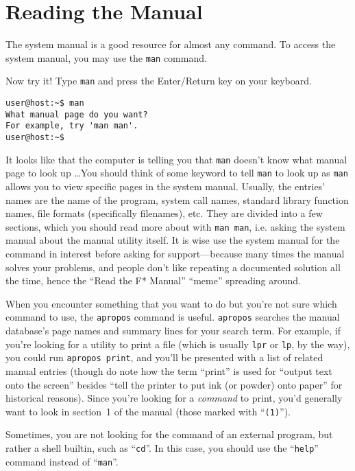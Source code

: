 \documentclass{book}
\begin{document}
\section{Reading the Manual}

The system manual is a good resource for almost any command. To access the system manual, you may use the \verb|man| command.

Now try it!  Type \verb|man| and press the Enter/Return key on your keyboard.
\begin{verbatim}
user@host:~$ man
What manual page do you want?
For example, try 'man man'.
user@host:~$
\end{verbatim}

It looks like that the computer is telling you that \verb|man| doesn't know what manual page to look up \ldots You should think of some keyword to tell \verb|man| to look up as \verb|man| allows you to view specific pages in the system manual. Usually, the entries' names are the name of the program, system call names, standard library function names, file formats (specifically filenames), etc. They are divided into a few sections, which you should read more about with \verb|man man|, i.e. asking the system manual about the manual utility itself. It is wise use the system manual for the command in interest before asking for support---because many times the manual solves your problems, and people don't like repeating a documented solution all the time, hence the ``Read the F* Manual'' ``meme'' spreading around.

When you encounter something that you want to do but you're not sure which command to use, the \verb|apropos| command is useful. \verb|apropos| searches the manual database's page names and summary lines for your search term. For example, if you're looking for a utility to print a file (which is usually \verb|lpr| or \verb|lp|, by the way), you could run \verb|apropos print|, and you'll be presented with a list of related manual entries (though do note how the term ``print'' is used for ``output text onto the screen'' besides ``tell the printer to put ink (or powder) onto paper'' for historical reasons). Since you're looking for a \emph{command} to print, you'd generally want to look in section~1 of the manual (those marked with ``\verb|(1)|'').

Sometimes, you are not looking for the command of an external program, but rather a shell builtin, such as ``\verb|cd|''. In this case, you should use the ``\verb|help|'' command instead of ``\verb|man|''.
\end{document}
